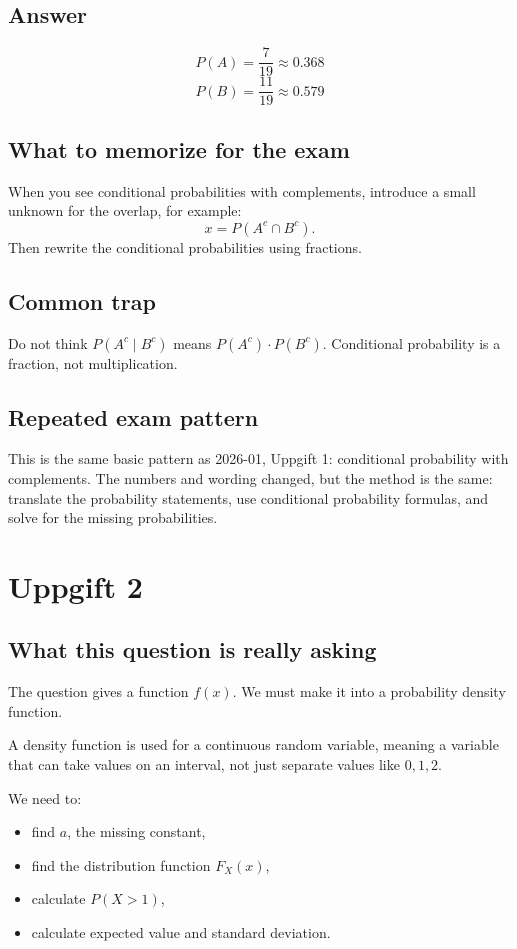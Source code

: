 \documentclass[11pt,a4paper]{article}
\begin{document}
\subsection*{Answer}
\[
\boxed{P(A)=\frac{7}{19}\approx 0.368}
\]
\[
\boxed{P(B)=\frac{11}{19}\approx 0.579}
\]

\subsection*{What to memorize for the exam}
When you see conditional probabilities with complements, introduce a small unknown for the overlap, for example:
\[
x=P(A^c\cap B^c).
\]
Then rewrite the conditional probabilities using fractions.

\subsection*{Common trap}
Do not think \(P(A^c\mid B^c)\) means \(P(A^c)\cdot P(B^c)\). Conditional probability is a fraction, not multiplication.

\subsection*{Repeated exam pattern}
This is the same basic pattern as 2026-01, Uppgift 1: conditional probability with complements. The numbers and wording changed, but the method is the same: translate the probability statements, use conditional probability formulas, and solve for the missing probabilities.

\section*{Uppgift 2}

\subsection*{What this question is really asking}
The question gives a function \(f(x)\). We must make it into a probability density function.

A density function is used for a continuous random variable, meaning a variable that can take values on an interval, not just separate values like \(0,1,2\).

We need to:
\begin{itemize}[leftmargin=*]
    \item find \(a\), the missing constant,
    \item find the distribution function \(F_X(x)\),
    \item calculate \(P(X>1)\),
    \item calculate expected value and standard deviation.
\end{itemize}
\end{document}
